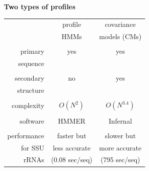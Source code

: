 \documentclass[landscape]{slides}
\begin{document}
\begin{slide}
\begin{center}
\large
\textbf{Two types of profiles}
\end{center}
\medskip



\begin{minipage}{6in}
\begin{center}
\small
\begin{tabular}{r|cc|} 
             & profile & covariance  \\
             & HMMs    & models (CMs) \\ \hline
  & & \\
  primary & yes & yes \\
  sequence & & \\
  & & \\
  secondary & no & yes \\
  structure & & \\
  & & \\
  complexity & $O(N^2)$ & $O(N^{3.4})$ \\
  & & \\
  software   & {\sc HMMER}     & {\sc Infernal} \\ 
  & & \\
  performance& faster but    & slower but    \\
  for SSU    & less accurate      & more accurate \\
  rRNAs      & (0.08 sec/seq)     & (795 sec/seq) \\
\end{tabular}
\end{center}

\end{minipage}
\end{slide}
\end{document}
